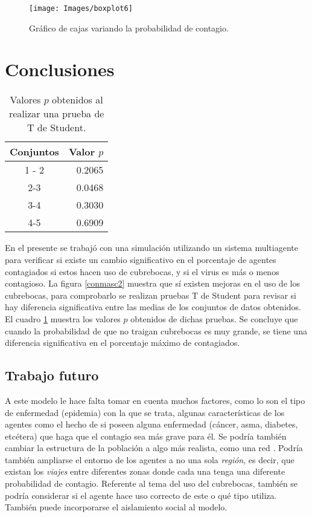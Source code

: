 \documentclass[final,6p,times,twocolumn]{elsarticle}
\begin{document}
	\begin{figure}
		\texttt{[image: Images/boxplot6]}
		\caption{Gráfico de cajas variando la probabilidad de contagio.}
		\label{fig:maxinf_proba}
	\end{figure}

	\section{Conclusiones}
	\begin{table}
		\centering
		\label{pvalue}
		\caption{Valores $p$ obtenidos al realizar una prueba de T de Student.}
		\begin{tabular}{|c|r|}
			\hline 
			Conjuntos & Valor $p$ \\ 
			\hline 
			1 - 2 & 0.2065 \\ 
			\hline 
			2-3 & 0.0468 \\ 
			\hline 
			3-4 & 0.3030 \\ 
			\hline 
			4-5 & 0.6909 \\ 
			\hline 
		\end{tabular} 
	\end{table}

	En el presente se trabajó con una simulación utilizando un sistema multiagente para verificar si existe un cambio significativo en el porcentaje de agentes contagiados si estos hacen uso de cubrebocas, y si el virus es más o menos contagioso. La figura \ref{conmasc2} muestra que sí existen mejoras en el uso de los cubrebocas, para comprobarlo se realizan pruebas T de Student para revisar si hay diferencia significativa entre las medias de los conjuntos de datos obtenidos. El cuadro \ref{pvalue} muestra los valores $p$ obtenidos de dichas pruebas. Se concluye que cuando la probabilidad de que no traigan cubrebocas es muy grande, se tiene una diferencia significativa en el porcentaje máximo de contagiados.
	
	\subsection{Trabajo futuro}
	
	A este modelo le hace falta tomar en cuenta muchos factores, como lo son el tipo de enfermedad (epidemia) con la que se trata, algunas características de los agentes como el hecho de si poseen alguna enfermedad (cáncer, asma, diabetes, etcétera) que haga que el contagio sea más grave para él. Se podría también cambiar la estructura de la población a algo más realista, como una red \citep{Venkatramanan_Lewis_Chen_Higdon_Vullikanti_Marathe_2018}. Podría también ampliarse el entorno de los agentes a no una sola \textit{región}, es decir, que existan los \textit{viajes} entre diferentes zonas donde cada una tenga una diferente probabilidad de contagio. Referente al tema del uso del cubrebocas, también se podría considerar si el agente hace uso correcto de este o qué tipo utiliza. También puede incorporarse el aislamiento social al modelo. 
	
	
	
	
	
	
	
\end{document}
